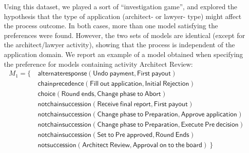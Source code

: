 Using this dataset, we played a sort of ``investigation game'', and explored the hypothesis that the type of application (architect- or lawyer- type) might affect the process outcome.
%
In both cases, more than one model %
satisfying the preferences were found. However, the two sets of models are identical (except for the architect/lawyer activity), showing that the process is independent of the application domain.
We report an example of a model obtained when specifying the preference for models containing activity \textsf{Architect Review}:
%
%
\begin{align*}
M_1 = \{ \ & \mathsf{ alternateresponse(Undo\ payment, First\ payout)} \\
& \mathsf{ chainprecedence(Fill\ out\ application, Initial\ Rejection)} \\
& \mathsf{ choice(Round\ ends, Change\ phase\ to\ Abort)} \\
& \mathsf{ notchainsuccession(Receive\ final\ report, First\ payout)} \\
& \mathsf{ notchainsuccession(Change\ phase\ to\ Preparation, Approve\ application)} \\
& \mathsf{ notchainsuccession(Change\ phase\ to\ Preparation, Execute\ Pre\ decision)} \\
& \mathsf{ notchainsuccession(Set\ to\ Pre\ approved, Round\ Ends)} \\
& \mathsf{ notsuccession(Architect\ Review, Approval\ on\ to\ the\ board)} \ \} 
\end{align*}


